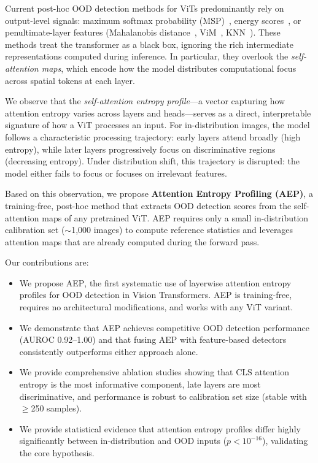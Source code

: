 \documentclass{article}
\newcommand{\AEP}{\textsc{AEP}}
\begin{document}
Current post-hoc OOD detection methods for ViTs predominantly rely on output-level signals: maximum softmax probability (MSP)~\citep{hendrycks2017baseline}, energy scores~\citep{liu2020energy}, or penultimate-layer features (Mahalanobis distance~\citep{lee2018simple}, ViM~\citep{wang2022vim}, KNN~\citep{sun2022out}). These methods treat the transformer as a black box, ignoring the rich intermediate representations computed during inference. In particular, they overlook the \emph{self-attention maps}, which encode how the model distributes computational focus across spatial tokens at each layer.

We observe that the \emph{self-attention entropy profile}---a vector capturing how attention entropy varies across layers and heads---serves as a direct, interpretable signature of how a ViT processes an input. For in-distribution images, the model follows a characteristic processing trajectory: early layers attend broadly (high entropy), while later layers progressively focus on discriminative regions (decreasing entropy). Under distribution shift, this trajectory is disrupted: the model either fails to focus or focuses on irrelevant features.

Based on this observation, we propose \textbf{Attention Entropy Profiling (\AEP{})}, a training-free, post-hoc method that extracts OOD detection scores from the self-attention maps of any pretrained ViT. \AEP{} requires only a small in-distribution calibration set ($\sim$1,000 images) to compute reference statistics and leverages attention maps that are already computed during the forward pass.

Our contributions are:
\begin{itemize}
    \item We propose \AEP{}, the first systematic use of layerwise attention entropy profiles for OOD detection in Vision Transformers. \AEP{} is training-free, requires no architectural modifications, and works with any ViT variant.
    \item We demonstrate that \AEP{} achieves competitive OOD detection performance (AUROC 0.92--1.00) and that fusing \AEP{} with feature-based detectors consistently outperforms either approach alone.
    \item We provide comprehensive ablation studies showing that CLS attention entropy is the most informative component, late layers are most discriminative, and performance is robust to calibration set size (stable with $\geq$250 samples).
    \item We provide statistical evidence that attention entropy profiles differ highly significantly between in-distribution and OOD inputs ($p < 10^{-16}$), validating the core hypothesis.
\end{itemize}
\end{document}
